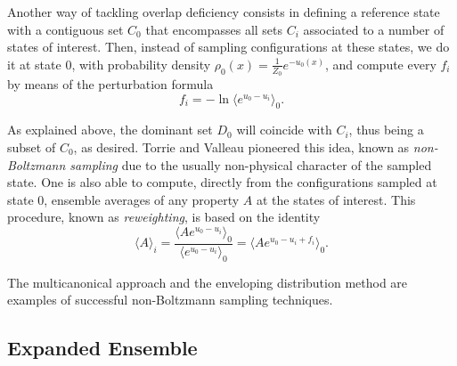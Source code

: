 \documentclass[aip,jcp,reprint,amsmath,amssymb]{revtex4-1}
\begin{document}
Another way of tackling overlap deficiency consists in defining a reference state with a contiguous set $C_0$ that encompasses all sets $C_i$ associated to a number of states of interest. Then, instead of sampling configurations at these states, we do it at state $0$, with probability density $\rho_0(x) = \frac{1}{Z_0} e^{-u_0(x)}$, and compute every $f_i$ by means of the perturbation formula
\begin{equation}
\label{eq:nbs sampling free energy}
f_i = -\ln \langle e^{u_0-u_i} \rangle_0.
\end{equation}

As explained above, the dominant set $D_0$ will coincide with $C_i$, thus being a subset of $C_0$, as desired. Torrie and Valleau\cite{Torrie_1977} pioneered this idea, known as \textit{non-Boltzmann sampling} due to the usually non-physical character of the sampled state. One is also able to compute, directly from the configurations sampled at state $0$, ensemble averages of any property $A$ at the states of interest. This procedure, known as \textit{reweighting}, is based on the identity\cite{Torrie_1977}
\begin{equation}
\label{eq:nbs sampling reweighting}
\langle A \rangle_i = \frac{\langle A e^{u_0 - u_i} \rangle_0}{\langle e^{u_0 - u_i} \rangle_0} = \langle A e^{u_0 - u_i + f_i} \rangle_0.
\end{equation}

The multicanonical approach\cite{Berg_1992, Lee_1993, Abreu_2006} and the enveloping distribution method\cite{Christ_2007, *Christ_2008, *Christ_2009} are examples of successful non-Boltzmann sampling techniques.

\subsection{Expanded Ensemble}
\label{sec:expanded ensemble}
	
\end{document}
